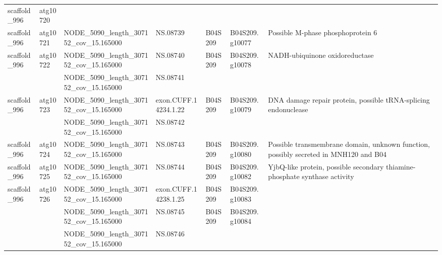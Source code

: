 \begin{longtable}{lllllll}
   scaffold\_996 &  atg10720 &                                         &                       &              &                 &                                                                                 \\
   scaffold\_996 &  atg10721 &   NODE\_5090\_length\_307152\_cov\_15.165000 &              NS.08739 &      B04S209 &  B04S209.g10077 &                                               Possible M-phase phosphoprotein 6 \\
   scaffold\_996 &  atg10722 &   NODE\_5090\_length\_307152\_cov\_15.165000 &              NS.08740 &      B04S209 &  B04S209.g10078 &                                                  NADH-ubiquinone oxidoreductase \\
                &           &   NODE\_5090\_length\_307152\_cov\_15.165000 &              NS.08741 &              &                 &                                                                                 \\
   scaffold\_996 &  atg10723 &   NODE\_5090\_length\_307152\_cov\_15.165000 &  exon.CUFF.14234.1.22 &      B04S209 &  B04S209.g10079 &                  DNA damage repair protein, possible tRNA-splicing endonuclease \\
                &           &   NODE\_5090\_length\_307152\_cov\_15.165000 &              NS.08742 &              &                 &                                                                                 \\
   scaffold\_996 &  atg10724 &   NODE\_5090\_length\_307152\_cov\_15.165000 &              NS.08743 &      B04S209 &  B04S209.g10080 &  Possible transmembrane domain, unknown function, possibly secreted in MNH120 and B04 \\
   scaffold\_996 &  atg10725 &   NODE\_5090\_length\_307152\_cov\_15.165000 &              NS.08744 &      B04S209 &  B04S209.g10082 &      YjbQ-like protein, possible secondary thiamine-phosphate synthase activity \\
   scaffold\_996 &  atg10726 &   NODE\_5090\_length\_307152\_cov\_15.165000 &  exon.CUFF.14238.1.25 &      B04S209 &  B04S209.g10083 &                                                                                 \\
                &           &    NODE\_5090\_length\_307152\_cov\_15.165000 &              NS.08745 &      B04S209 &  B04S209.g10084 &                                                                                 \\
                &           &    NODE\_5090\_length\_307152\_cov\_15.165000 &              NS.08746 &              &                 &                                                                                 \\

\end{longtable}
